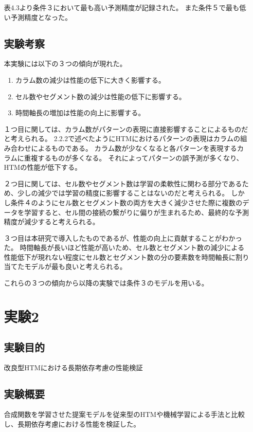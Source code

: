 表4.3より条件３において最も高い予測精度が記録された。
また条件５で最も低い予測精度となった。

\newpage
\subsection{実験考察}
本実験には以下の３つの傾向が現れた。

\begin{enumerate}
  \item カラム数の減少は性能の低下に大きく影響する。
  \item セル数やセグメント数の減少は性能の低下に影響する。
  \item 時間軸長の増加は性能の向上に影響する。
\end{enumerate}

１つ目に関しては、カラム数がパターンの表現に直接影響することによるものだと考えられる。
2.2.2で述べたようにHTMにおけるパターンの表現はカラムの組み合わせによるものである。
カラム数が少なくなると各パターンを表現するカラムに重複するものが多くなる。
それによってパターンの誤予測が多くなり、HTMの性能が低下する。

２つ目に関しては、セル数やセグメント数は学習の柔軟性に関わる部分であるため、少しの減少では学習の精度に影響することはないのだと考えられる。
しかし条件４のようにセル数とセグメント数の両方を大きく減少させた際に複数のデータを学習すると、セル間の接続の繋がりに偏りが生まれるため、最終的な予測精度が減少すると考えられる。

３つ目は本研究で導入したものであるが、性能の向上に貢献することがわかった。
時間軸長が長いほど性能が高いため、セル数とセグメント数の減少による性能低下が現れない程度にセル数とセグメント数の分の要素数を時間軸長に割り当てたモデルが最も良いと考えられる。

これらの３つの傾向から以降の実験では条件３のモデルを用いる。

\section{実験2}
\subsection{実験目的}
改良型HTMにおける長期依存考慮の性能検証

\subsection{実験概要}
合成関数を学習させた提案モデルを従来型のHTMや機械学習による手法と比較し、長期依存考慮における性能を検証した。

